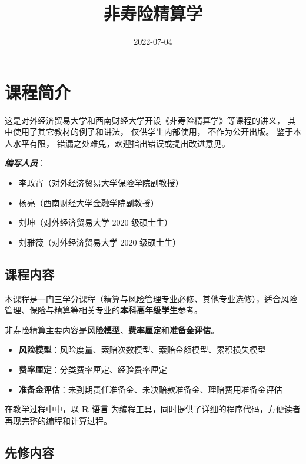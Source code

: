 \documentclass[
]{book}
\title{非寿险精算学}
\author{}
\date{\vspace{-2.5em}2022-07-04}
\providecommand{\tightlist}{%
  \setlength{\itemsep}{0pt}\setlength{\parskip}{0pt}}
\begin{document}
\maketitle

{
\setcounter{tocdepth}{1}
\tableofcontents
}
\hypertarget{prep}{%
\chapter{课程简介}\label{prep}}

这是对外经济贸易大学和西南财经大学开设《非寿险精算学》等课程的讲义， 其中使用了其它教材的例子和讲法， 仅供学生内部使用， 不作为公开出版。 鉴于本人水平有限， 错漏之处难免，欢迎指出错误或提出改进意见。

\textbf{\emph{编写人员}}：

\begin{itemize}
\item
  李政宵（对外经济贸易大学保险学院副教授）
\item
  杨亮（西南财经大学金融学院副教授）
\item
  刘坤（对外经济贸易大学 2020 级硕士生）
\item
  刘雅薇（对外经济贸易大学 2020 级硕士生）
\end{itemize}

\hypertarget{ux8bfeux7a0bux5185ux5bb9}{%
\section{课程内容}\label{ux8bfeux7a0bux5185ux5bb9}}

本课程是一门三学分课程（精算与风险管理专业必修、其他专业选修），适合风险管理、保险与精算等相关专业的\textbf{本科高年级学生}参考。

非寿险精算主要内容是\textbf{风险模型}、\textbf{费率厘定}和\textbf{准备金评估}。

\begin{itemize}
\tightlist
\item
  \textbf{风险模型}：风险度量、索赔次数模型、索赔金额模型、累积损失模型
\item
  \textbf{费率厘定}：分类费率厘定、经验费率厘定
\item
  \textbf{准备金评估}：未到期责任准备金、未决赔款准备金、理赔费用准备金评估
\end{itemize}

在教学过程中中，以 \textbf{R 语言} 为编程工具，同时提供了详细的程序代码，方便读者再现完整的编程和计算过程。

\hypertarget{ux5148ux4feeux5185ux5bb9}{%
\section{先修内容}\label{ux5148ux4feeux5185ux5bb9}}
\end{document}
